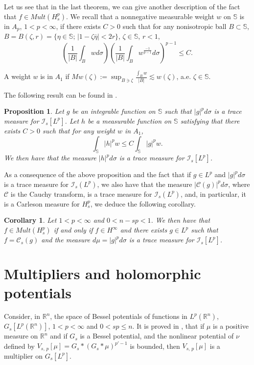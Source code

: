 \documentclass[12pt,twoside,leqno,final]{amsart}
\theoremstyle{plain}
\newtheorem{prop}[thm]{Proposition}
\newtheorem{cor}[thm]{Corollary}
\begin{document}
Let us see that in the last theorem, we can give another description of the fact that $f\in Mult(H_s^p)$.
 We recall that a nonnegative measurable weight  $w$ on ${{\mathbb S}}$ is in $A_p$, $1<p<\infty$,  if there exists $C>0$ such that for any nonisotropic ball $B\subset {{\mathbb S}}$, $B=B(\zeta,r)=\{\eta\in{{\mathbb S}};\, |1-\zeta\overline{\eta}|<2r\}$, $\zeta\in{{\mathbb S}}$, $r<1$, 
$$\left( \frac{1}{|B|}\int_B w d\sigma\right)\left( \frac{1}{|B|}\int_B w^{\frac{-1}{p-1}}d\sigma \right)^{p-1}\leq C.$$

A weight $w$ is in $A_1$ if ${\displaystyle Mw(\zeta):=\sup_{B\ni \zeta} \frac{\int_Bw}{|B|}\lesssim w(\zeta)}$, a.e. $\zeta\in{{\mathbb S}}$.

The following result can be found in \cite{mazyaverbitsky}.
\begin{prop}\label{prop:tracemeasure3}
Let $g$ be an integrable function on ${{\mathbb S}}$ such that $|g|^pd\sigma$ is a trace measure for $\mathcal{I}_s[L^p]$.
Let $h$ be a measurable function on ${{\mathbb S}}$ satisfying that there exists $C>0$ such that for any  weight $w$ in $A_1$,
\begin{equation}\label{eqn:weightestimate}
\int_{{\mathbb S}} |h|^pw\leq C \int_{{\mathbb S}} |g|^p w.
 \end{equation}
We then have that the measure $|h|^pd\sigma$ is a trace measure for $\mathcal{I}_s[L^p]$.
\end{prop}
As a  consequence of the above proposition and the fact that if $g\in L^p$ and $|g|^pd\sigma$ is a trace measure for ${\mathcal I}_s(L^p)$, we also have that the measure $|{\mathcal C}(g)|^pd\sigma$, where ${\mathcal C}$ is the Cauchy transform, is a trace measure for ${\mathcal I}_s(L^p)$, and, in particular, it is a Carleson measure for $H_s^p$, we deduce the following corollary.
\begin{cor} 
Let $1<p<\infty$ and $0<n-sp<1$. We then have that $f\in Mult(H_s^p)$ if and only if $f\in H^\infty$ and there exists $g\in L^p$ such that $f={\mathcal C}_s(g)$ and
the measure $d\mu=|g|^pd\sigma $ is a trace measure for $\mathcal{I}_s[L^p]$.
\end{cor}

\section{Multipliers and holomorphic potentials}\label{sec:multholpot}

Consider, in ${{\mathbb R}}^n$, the space of Bessel potentials of functions in $L^p({{\mathbb R}}^n)$, $G_s[L^p({{\mathbb R}}^n)]$, $1<p<\infty$ and $0<sp\leq n$. It is proved in \cite{boe}, that if $\mu$ is a positive measure on ${{\mathbb R}}^n$ and if $G_s$ is a Bessel potential, and   the nonlinear potential of $\nu$ defined by $V_{s,\,p}[\mu]= G_s*(G_s*\mu)^{p'-1}$ is bounded, then $V_{s,\,p}[\mu]$ is a multiplier on $G_s[L^p]$. 
\end{document}
